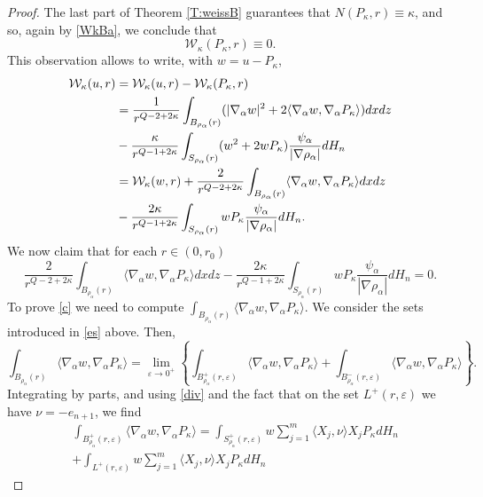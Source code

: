 \documentclass[11pt]{amsart}
\theoremstyle{plain}
\numberwithin{equation}{section}
\begin{document}
\begin{proof}
The last part of Theorem  \ref{T:weissB}
 guarantees that $N(P_\kappa,r) \equiv \kappa$, and so, again by \eqref{WkBa}, we conclude that
\[
\mathcal W_\kappa(P_\kappa,r) \equiv 0.
\]
This observation allows to write, with $w = u - P_\kappa$,
\begin{align}\label{M3}
\mathcal W_\kappa(u,r) & = \mathcal W_\kappa(u,r) - \mathcal W_\kappa(P_\kappa,r)
\\
& = \frac{1}{r^{Q-2+2\kappa}} \int_{{B_{\rho_\alpha}(r)}} (|{\nabla_\alpha} w|^2 + 2 \langle{\nabla_\alpha} w,{\nabla_\alpha} P_\kappa\rangle)dx dz
\notag\\
& - \frac{\kappa}{r^{Q-1+2\kappa}} \int_{{S_{\rho_\alpha}(r)}} (w^2 + 2 w P_\kappa) \frac{\psi_\alpha}{|\nabla {\rho_\alpha}|}dH_{n}
\notag\\
& = \mathcal W_\kappa(w,r)  + \frac{2}{r^{Q-2+2\kappa}} \int_{{B_{\rho_\alpha}(r)}} \langle{\nabla_\alpha} w,{\nabla_\alpha} P_\kappa\rangle dx dz
\notag
\\
& - \frac{2\kappa}{r^{Q-1+2\kappa}} \int_{{S_{\rho_\alpha}(r)}} w P_\kappa \frac{\psi_\alpha}{|\nabla {\rho_\alpha}|}dH_{n}.
\notag
\end{align}
We now claim that for each $r\in (0,r_0)$
\begin{equation}\label{c}
\frac{2}{r^{Q-2+2\kappa}} \int_{{B_{\rho_\alpha}(r)}} \langle{\nabla_\alpha} w,{\nabla_\alpha} P_\kappa\rangle dx dz - \frac{2\kappa}{r^{Q-1+2\kappa}} \int_{{S_{\rho_\alpha}(r)}} w P_\kappa \frac{\psi_\alpha}{|\nabla {\rho_\alpha}|}dH_{n} = 0.
\end{equation}
To prove \eqref{c} we need to compute $\int_{{B_{\rho_\alpha}(r)}} \langle{\nabla_\alpha} w,{\nabla_\alpha} P_\kappa\rangle$.
We consider the sets introduced in \eqref{es} above. Then,
\[
\int_{{B_{\rho_\alpha}(r)}} \langle{\nabla_\alpha} w,{\nabla_\alpha} P_\kappa\rangle   = \underset{{\varepsilon}\to 0^+}{\lim} \left\{\int_{{B^+_{\rho_\alpha}(r,{\varepsilon})}} \langle{\nabla_\alpha} w,{\nabla_\alpha} P_\kappa\rangle  +  \int_{{B^-_{\rho_\alpha}(r,{\varepsilon})}} \langle{\nabla_\alpha} w,{\nabla_\alpha} P_\kappa\rangle \right\}.
\]
Integrating by parts, and using \eqref{div} and the fact that on the set $L^+(r,{\varepsilon})$ we have $\nu = - e_{n+1}$, we find
\begin{align*}
& \int_{{B^+_{\rho_\alpha}(r,{\varepsilon})}}  \langle{\nabla_\alpha} w,{\nabla_\alpha} P_\kappa\rangle   = \int_{{S^+_{\rho_\alpha}(r,{\varepsilon})}} w \sum_{j=1}^m \langle X_j,\nu\rangle X_j P_\kappa dH_{n}
\\
& + \int_{{L^+(r,{\varepsilon})}} w \sum_{j=1}^m \langle X_j,\nu\rangle X_j P_\kappa dH_{n}

\end{align*}
\end{proof}
\end{document}
